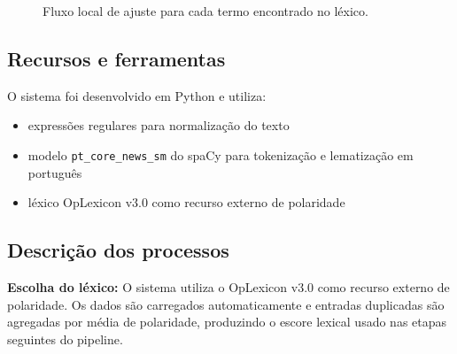 \documentclass[11pt,a4paper]{article}
\begin{document}
\begin{figure}[h]
\centering
{}
\caption{Fluxo local de ajuste para cada termo encontrado no léxico.}
\end{figure}

\subsection{Recursos e ferramentas}

O sistema foi desenvolvido em Python e utiliza:
\begin{itemize}
  \item expressões regulares para normalização do texto
  \item modelo \texttt{pt\_core\_news\_sm} do spaCy para tokenização e lematização em português
  \item léxico OpLexicon v3.0 como recurso externo de polaridade
\end{itemize}

\subsection{Descrição dos processos}

\textbf{Escolha do léxico:}
O sistema utiliza o OpLexicon v3.0 como recurso externo de polaridade. Os dados são carregados automaticamente e entradas duplicadas são agregadas por média de polaridade, produzindo o escore lexical usado nas etapas seguintes do pipeline.
\end{document}
